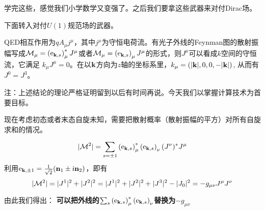 \documentclass[CJK]{beamer}
\begin{document}
\begin{frame}
\bch
学完这些，感觉我们小学数学又变强了。之后我们要拿这些武器来对付Dirac场。
\skiplines

下面转入对付$U(1)$规范场的武器。
\ech
\end{frame}

\begin{frame}
\bch
{\small
QED相互作用为$qA_\mu j^\mu$，其中$j^\mu$为守恒电荷流。有光子外线的Feynman图的散射振幅写成${\mathcal{M}}_\mu = \left(\mathrm{e}_{{\mathbf{k}},s}\right)_\mu^* J^\mu$或者${\mathcal{M}}_\mu = \left(\mathrm{e}_{{\mathbf{k}},s}\right)_\mu J^\mu$的形式，则$J^\mu$可以看成$k$空间的守恒流，它满足
$k_\mu J^\mu = 0$。在以${\mathbf{k}}$方向为$z$轴的坐标系里，$k_\mu =(|{\mathbf{k}}|, 0, 0, -|{\mathbf{k}}|)$, 从而有$J^0 = J^3$。

{\scriptsize 注：上述结论的理论严格证明留到以后有时间再说。今天我们以掌握计算技术为首要目标。}

现在考虑初态或者末态自旋未知，需要把散射概率（散射振幅的平方）对所有自旋求和的情况。

$$|{\mathcal{M}}^2| = \sum_{s=\pm 1} \left(\mathrm{e}_{{\mathbf{k}},s}\right)^*_\mu \left(\mathrm{e}_{{\mathbf{k}},s}\right)_\nu (J^\nu)^*J^\mu $$
利用$\mathrm{e}_{{\mathbf{k}},\pm 1} = \frac{1}{\sqrt{2}}( {\mathbf{n}}_1 \pm {\dot{\imath}} {\mathbf{n}}_2)$，即有
$$|{\mathcal{M}}^2| = |J^1|^2 + |J^2|^2 =  |J^1|^2 + |J^2|^2 + |J^3|^2 - |J_0|^2 = -g_{\mu\nu}J^\mu J^\nu $$

由此我们得出：
{\bf 可以把外线的$\sum_{s} \left(\mathrm{e}_{{\mathbf{k}},s}\right)^*_\mu \left(\mathrm{e}_{{\mathbf{k}},s}\right)_\nu$替换为$-g_{\mu\nu}$}
}

\ech

\end{frame}
\end{document}
